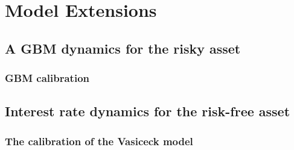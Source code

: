 \chapter{Model Extensions}

\section{A GBM dynamics for the risky asset}

\subsection{GBM calibration}



\section{Interest rate dynamics for the risk-free asset}

\subsection{The calibration of the Vasiceck model}
